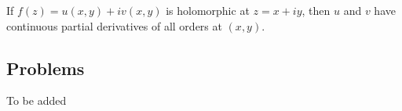 \vspace*{1em}

\begin{corollary}
If $f(z) = u(x,y) + iv(x,y)$ is holomorphic at $z = x + iy$, then $u$ and $v$ have continuous partial derivatives of all orders at $(x,y)$. 
\end{corollary}

\vspace*{2em}

\subsection{Problems}
\vspace{0.1in}
To be added
%

